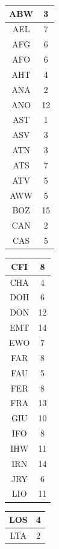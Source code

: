 \documentclass[main.tex]{subfiles}
\begin{document}
\begin{table}
	\centering
\begin{minipage}[t]{0.24\linewidth}
\vspace{0pt}\centering
\begin{tabular}{|c|c|}
\hline
ABW&3\\\hline
AEL&7\\\hline
AFG&6\\\hline
AFO&6\\\hline
AHT&4\\\hline
ANA&2\\\hline
ANO&12\\\hline
AST&1\\\hline
ASV&3\\\hline
ATN&3\\\hline
ATS&7\\\hline
ATV&5\\\hline
AWW&5\\\hline
BOZ&15\\\hline
CAN&2\\\hline
CAS&5
\end{tabular}
\end{minipage}%
\begin{minipage}[t]{0.24\linewidth}
\vspace{0pt}\centering
\begin{tabular}{|c|c|}
CFI&8\\\hline
CHA&4\\\hline
DOH&6\\\hline
DON&12\\\hline
EMT&14\\\hline
EWO&7\\\hline
FAR&8\\\hline
FAU&5\\\hline
FER&8\\\hline
FRA&13\\\hline
GIU&10\\\hline
IFO&8\\\hline
IHW&11\\\hline
IRN&14\\\hline
JRY&6\\\hline
LIO&11
\end{tabular}
\end{minipage}%
\begin{minipage}[t]{0.24\linewidth}
\vspace{0pt}\centering
\begin{tabular}{|c|c|}
LOS&4\\\hline
LTA&2\\\hline

\end{tabular}
\end{minipage}
\end{table}
\end{document}
